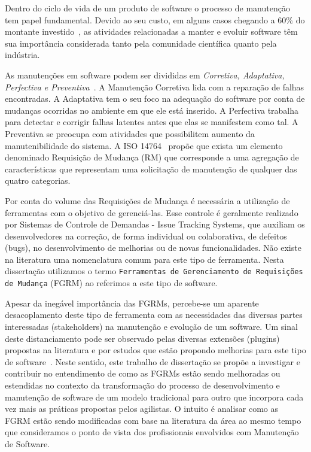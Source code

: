 Dentro do ciclo de vida de um produto de software o processo de manutenção tem
papel fundamental. Devido ao seu custo, em alguns casos chegando a 60\% do
montante investido~\cite{kaur2015review}, as atividades relacionadas a manter e
evoluir software têm sua importância considerada tanto pela comunidade
científica quanto pela indústria.

As manutenções em software podem ser divididas em \textit{Corretiva,
Adaptativa, Perfectiva e Preventiva}~\cite{Lientz:1980:SMM:601062,159342}. A
Manutenção Corretiva lida com a reparação de falhas encontradas. A Adaptativa
tem o seu foco na adequação do software por conta de mudanças ocorridas no
ambiente em que ele está inserido. A Perfectiva trabalha para detectar e
corrigir falhas latentes antes que elas se manifestem como tal. A Preventiva se
preocupa com atividades que possibilitem aumento da manutenibilidade do
sistema. A ISO 14764~\cite{1703974} propõe que exista um elemento denominado
Requisição de Mudança (RM) que corresponde a uma agregação de características
que representam uma solicitação de manutenção de qualquer das quatro
categorias.

Por conta do volume das Requisições de Mudança é necessária a utilização de
ferramentas com o objetivo de gerenciá-las. Esse controle é geralmente
realizado por Sistemas de Controle de Demandas - Issue Tracking Systems, que
auxiliam os desenvolvedores na correção, de forma individual ou colaborativa,
de defeitos (bugs), no desenvolvimento de melhorias ou de novas
funcionalidades. Não existe na literatura uma nomenclatura comum para este tipo
de ferramenta. Nesta dissertação utilizamos o termo \texttt{Ferramentas de
Gerenciamento de Requisições de Mudança} (FGRM) ao referimos a este tipo de
software.

Apesar da inegável importância das FGRMs, percebe-se um aparente desacoplamento
deste tipo de ferramenta com as necessidades das diversas partes interessadas
(stakeholders) na manutenção e evolução de um software. Um sinal deste
distanciamento pode ser observado pelas diversas extensões (plugins) propostas
na literatura
\cite{101186,Thung:2014:BIT:2635868.2661678,Kononenko:2014:DED:2591062.2591075}
e por estudos que estão propondo melhorias para este tipo de
software~\cite{zimmermann2010makes, cavalcanti2014challenges,
zimmermann2009improving}. Neste sentido, este trabalho de dissertação se propõe
a investigar e contribuir no entendimento de como as FGRMs estão sendo
melhoradas ou estendidas no contexto da transformação do processo de
desenvolvimento e manutenção de software de um modelo tradicional para outro
que incorpora cada vez mais as práticas propostas pelos agilistas. O intuito é
analisar como as FGRM estão sendo modificadas com base na literatura da área ao
mesmo tempo que consideramos o ponto de vista dos profissionais envolvidos com
Manutenção de Software.

